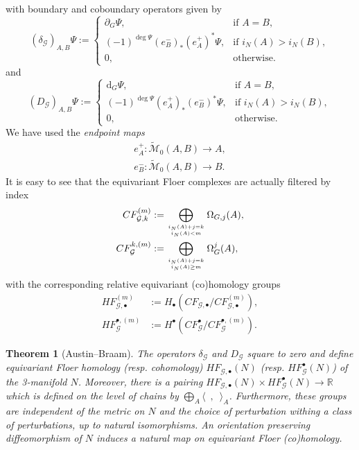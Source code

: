 \documentclass[11pt,colorinlistoftodos]{amsart}
\numberwithin{equation}{subsection}
\theoremstyle{plain}
\newtheorem{thm}{Theorem}[subsection]
\theoremstyle{definition}
\theoremstyle{remark}
\newcommand{\R}{\mathbb{R}}
\newcommand{\dd}{{\mathrm{d}}}
\newcommand{\de}{\partial}
\newcommand{\calG}{\mathcal{G}}
\newcommand{\calM}{\mathcal{M}}
\begin{document}
with boundary and coboundary operators given by 
\begin{equation}
    (\delta_\calG)_{A,B}\Psi:=\begin{cases}\de_G\Psi,& \text{if $A=B$},\\ (-1)^{\deg\Psi}(e^-_{B})_*(e_A^+)^*\Psi,&\text{if $i_N(A)>i_N(B)$},\\ 0,&\text{otherwise}.\end{cases}
\end{equation}
and 
\begin{equation}
    (D_\calG)_{A,B}\Psi:=\begin{cases}\dd_G\Psi,& \text{if $A=B$},\\ (-1)^{\deg\Psi}(e^+_{A})_*(e_B^-)^*\Psi,&\text{if $i_N(A)>i_N(B)$},\\ 0,&\text{otherwise}.\end{cases}
\end{equation}
We have used the \emph{endpoint maps}
\begin{align*}
    e_A^+\colon\widetilde{\calM}_0(A,B)\to A,\\
    e_B^-\colon\widetilde{\calM}_0(A,B)\to B.
\end{align*}
It is easy to see that the equivariant Floer complexes are actually filtered by index
\begin{align}
    CF^{(m)}_{\calG,k}&:=\bigoplus_{i_N(A)+j=k\atop i_N(A)<m}\Omega_{G,j}(A),\\
    CF^{k,(m)}_\calG&:=\bigoplus_{i_N(A)+j=k\atop i_N(A)\geq m}\Omega^j_G(A),
\end{align}
with the corresponding relative equivariant (co)homology groups
\begin{align}
    HF^{(m)}_{\calG,\bullet}&:=H_\bullet(CF_{\calG,\bullet}/CF^{(m)}_{\calG,\bullet}),\\
    HF^{\bullet,(m)}_{\calG}&:=H^\bullet(CF^\bullet_\mathcal{G}/CF^{\bullet,(m)}_\calG).
\end{align}
\begin{thm}[Austin--Braam\cite{AustinBraam1996}]
The operators $\delta_\calG$ and $D_\calG$ square to zero and define equivariant Floer homology (resp. cohomology) $HF_{\calG,\bullet}(N)$ (resp. $HF^\bullet_\calG(N)$) of the 3-manifold $N$. Moreover, there is a pairing $HF_{\calG,\bullet}(N)\times HF^\bullet_\calG(N)\to \R$ which is defined on the level of chains by $\bigoplus_A\langle\enspace,\enspace\rangle_A$. Furthermore, these groups are independent of the metric on $N$ and the choice of perturbation withing a class of perturbations, up to natural isomorphisms. An orientation preserving diffeomorphism of $N$ induces a natural map on equivariant Floer (co)homology.
\end{thm}
\end{document}

